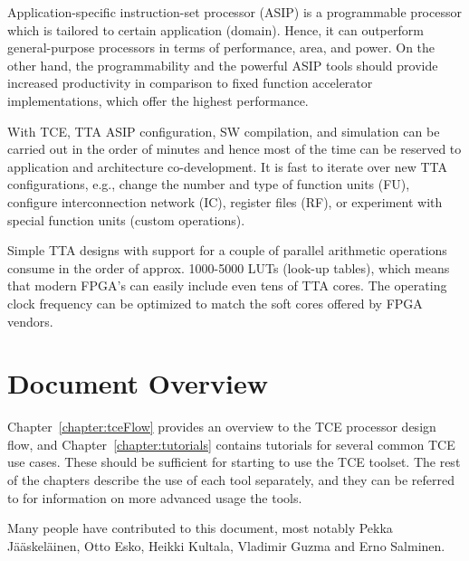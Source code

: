 \documentclass[twoside]{tceusermanual}
\begin{document}
Application-specific instruction-set processor (ASIP) is a
programmable processor which is tailored to certain application
(domain). Hence, it can outperform general-purpose processors in terms
of performance, area, and power. On the other hand, the programmability
and the powerful ASIP tools should provide increased productivity in
comparison to fixed function accelerator implementations, which offer the
highest performance.

With TCE, TTA ASIP configuration, SW compilation, and simulation can
be carried out in the order of minutes and hence most of the time can
be reserved to application and architecture co-development. It is fast
to iterate over new TTA configurations, e.g., change the number and
type of function units (FU), configure interconnection network (IC),
register files (RF), or experiment with special function units 
(custom operations).  

Simple TTA designs with support for a couple of
parallel arithmetic operations consume in the order of
approx. 1000-5000 LUTs (look-up tables), which means that modern FPGA's
can easily include even tens of TTA cores. The operating clock frequency can
be optimized to match the soft cores offered by FPGA vendors.

\section{Document Overview}

Chapter~\ref{chapter:tceFlow} provides an overview to the TCE
processor design flow, and Chapter~\ref{chapter:tutorials} contains
tutorials for several common TCE use cases. These should be sufficient
for starting to use the TCE toolset.  The rest of the chapters
describe the use of each tool separately, and they can be referred to
for information on more advanced usage the tools.

Many people have contributed to this document, most notably Pekka
Jääskeläinen, Otto Esko, Heikki Kultala, Vladimir Guzma and Erno
Salminen.
\end{document}
